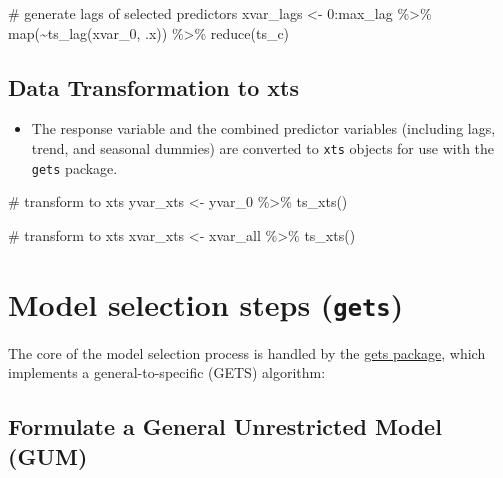 \documentclass[
  letterpaper,
  DIV=11,
  numbers=noendperiod]{scrreport}
\newenvironment{Shaded}{\begin{snugshade}}{\end{snugshade}}
\newcommand{\CommentTok}[1]{\textcolor[rgb]{0.37,0.37,0.37}{#1}}
\newcommand{\DecValTok}[1]{\textcolor[rgb]{0.68,0.00,0.00}{#1}}
\newcommand{\FunctionTok}[1]{\textcolor[rgb]{0.28,0.35,0.67}{#1}}
\newcommand{\NormalTok}[1]{\textcolor[rgb]{0.00,0.23,0.31}{#1}}
\newcommand{\OtherTok}[1]{\textcolor[rgb]{0.00,0.23,0.31}{#1}}
\newcommand{\SpecialCharTok}[1]{\textcolor[rgb]{0.37,0.37,0.37}{#1}}
\providecommand{\tightlist}{%
  \setlength{\itemsep}{0pt}\setlength{\parskip}{0pt}}\usepackage{longtable,booktabs,array}
\begin{document}
\begin{Shaded}
\begin{Highlighting}[]
\CommentTok{\# generate lags of selected predictors}
\NormalTok{xvar\_lags }\OtherTok{\textless{}{-}} \DecValTok{0}\SpecialCharTok{:}\NormalTok{max\_lag }\SpecialCharTok{\%\textgreater{}\%} 
  \FunctionTok{map}\NormalTok{(}\SpecialCharTok{\textasciitilde{}}\FunctionTok{ts\_lag}\NormalTok{(xvar\_0, .x)) }\SpecialCharTok{\%\textgreater{}\%} 
  \FunctionTok{reduce}\NormalTok{(ts\_c)}
\end{Highlighting}
\end{Shaded}

\subsection{Data Transformation to
xts}\label{data-transformation-to-xts}

\begin{itemize}
\tightlist
\item
  The response variable and the combined predictor variables (including
  lags, trend, and seasonal dummies) are converted to \texttt{xts}
  objects for use with the \texttt{gets} package.
\end{itemize}

\begin{Shaded}
\begin{Highlighting}[]
\CommentTok{\# transform to xts}
\NormalTok{yvar\_xts }\OtherTok{\textless{}{-}}\NormalTok{ yvar\_0 }\SpecialCharTok{\%\textgreater{}\%}
  \FunctionTok{ts\_xts}\NormalTok{()}

\CommentTok{\# transform to xts}
\NormalTok{xvar\_xts }\OtherTok{\textless{}{-}}\NormalTok{ xvar\_all }\SpecialCharTok{\%\textgreater{}\%}
  \FunctionTok{ts\_xts}\NormalTok{()}
\end{Highlighting}
\end{Shaded}

\section{\texorpdfstring{Model selection steps
(\texttt{gets})}{Model selection steps (gets)}}\label{model-selection-steps-gets}

The core of the model selection process is handled by the
\href{https://cran.r-project.org/web/packages/gets/index.html}{gets
package}, which implements a general-to-specific (GETS) algorithm:

\subsection{Formulate a General Unrestricted Model
(GUM)}\label{formulate-a-general-unrestricted-model-gum}
\end{document}

